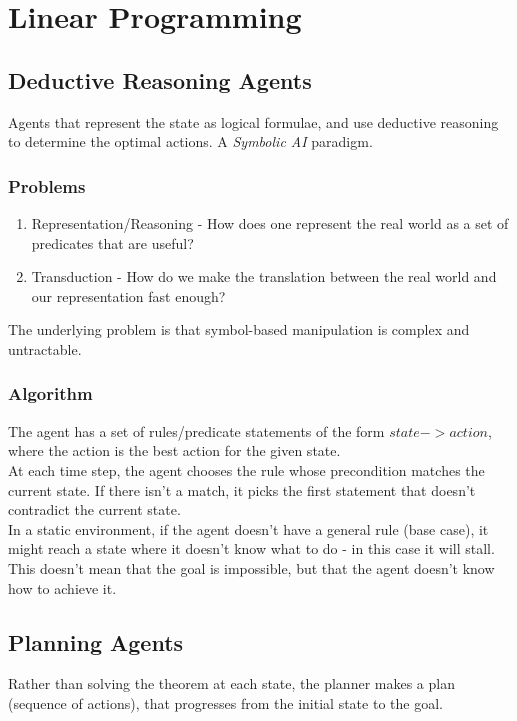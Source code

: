 \section{Linear Programming}

\subsection{Deductive Reasoning Agents}
Agents that represent the state as logical formulae, and use deductive reasoning to determine the optimal actions. A \emph{Symbolic AI} paradigm. 

\subsubsection{Problems}
\begin{enumerate}
    \item Representation/Reasoning - How does one represent the real world as a set of \\ predicates that are useful?
    \item Transduction - How do we make the translation between the real world and our representation fast enough?
\end{enumerate}

The underlying problem is that symbol-based manipulation is complex and untractable.

\subsubsection{Algorithm}
The agent has a set of rules/predicate statements of the form $state -> action$, where the action is the best action for the given state.\\

At each time step, the agent chooses the rule whose precondition matches the current state. If there isn't a match, it picks the first statement that doesn't contradict the current state. \\

In a static environment, if the agent doesn't have a general rule (base case), it might reach a state where it doesn't know what to do - in this case it will stall. This doesn't mean that the goal is impossible, but that the agent doesn't know how to achieve it. 

\subsection{Planning Agents}
Rather than solving the theorem at each state, the planner makes a plan (sequence of actions), that progresses from the initial state to the goal.

